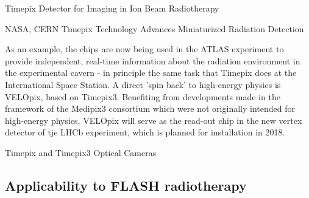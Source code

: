     Timepix Detector for Imaging in Ion Beam Radiotherapy

    NASA, CERN Timepix Technology Advances Miniaturized Radiation Detection  

    As an example, the chips are now being used in the ATLAS experiment to provide independent, real-time information about the radiation environment in the experimental cavern - in principle the same task that Timepix does at the International Space Station. A direct 'spin back' to high-energy physics is VELOpix, based on Timepix3. Benefiting from developments made in the framework of the Medipix3 consortium which were not originally intended for high-energy physics, VELOpix will serve as the read-out chip in the new vertex detector of tje LHCb experiment, which is planned for installation in 2018.
    
    Timepix and Timepix3 Optical Cameras 

    \subsection{Applicability to FLASH radiotherapy}